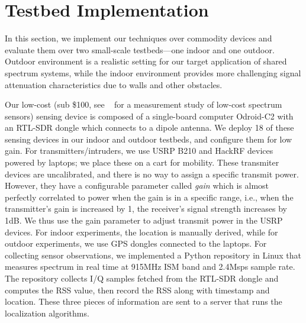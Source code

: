 \section{Testbed Implementation}
\label{sec:testbed}

In this section, we implement our techniques over commodity devices
and evaluate them over two small-scale testbeds---one indoor and one
outdoor.  Outdoor environment is a realistic setting for our target
application of shared spectrum systems, while the indoor environment
provides more challenging signal attenuation characteristics due to
walls and other obstacles.

  Our low-cost (sub \$100, see ~\cite{pam19-lowcostsensing} for a measurement study of low-cost spectrum sensors)
sensing device  is composed of a single-board computer
Odroid-C2 with an RTL-SDR dongle which
connects to a dipole antenna. We deploy 18 of these sensing devices
in our indoor and outdoor testbeds, and configure them for low gain.
For transmitters/intruders, we use USRP B210 and HackRF devices
  powered by laptops; we place these on a cart for mobility. These
  transmiter devices are uncalibrated, and there is no way to assign a
  specific transmit power. However, they have a configurable parameter
  called {\em gain} which is almost perfectly correlated to power when
  the gain is in a specific range, i.e., when the transmitter's gain
  is increased by 1, the receiver's signal strength increases by
  1dB. We thus use the gain parameter to adjust transmit power in the
  USRP devices. For indoor experiments, the location is manually
  derived, while for outdoor experiments, we use GPS
  dongles connected to the laptops. For collecting sensor
  observations, we implemented a Python repository in Linux that
  measures spectrum in real time at 915MHz ISM band and 2.4Msps
  sample rate.  The repository collects I/Q samples fetched from the
  RTL-SDR dongle and computes the RSS value, then record the RSS along
  with timestamp and location.  These three pieces of information are
  sent to a server that runs the localization algorithms. 

